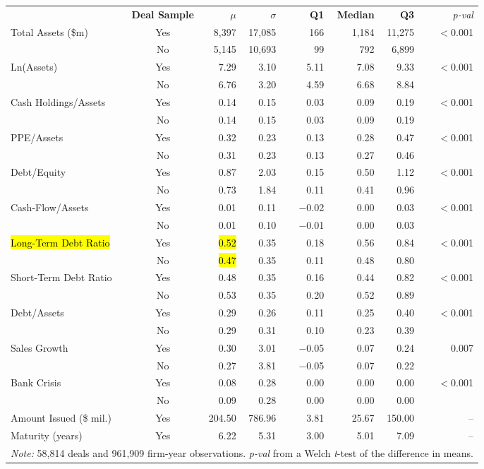 \documentclass[border=6pt]{standalone}
\begin{document}
\begin{tabular}{lcrrcrrrcr}
\toprule
 & \textbf{Deal Sample} & $\mu$ & $\sigma$ & & \textbf{Q1} & \textbf{Median} & \textbf{Q3} & & \textit{p-val} \\
\cmidrule{2-2} \cmidrule{3-4} \cmidrule{6-8} \cmidrule{10-10}
Total Assets (\$m) & Yes & 8,397 & 17,085 & & 166 & 1,184 & 11,275 & & $<$0.001 \\
 & No & 5,145 & 10,693 & & 99 & 792 & 6,899 & & \\ \cmidrule{2-10}
Ln(Assets) & Yes & 7.29 & 3.10 & & 5.11 & 7.08 & 9.33 & & $<$0.001 \\
 & No & 6.76 & 3.20 & & 4.59 & 6.68 & 8.84 & & \\ \cmidrule{2-10}
Cash Holdings/Assets & Yes & 0.14 & 0.15 & & 0.03 & 0.09 & 0.19 & & $<$0.001 \\
 & No & 0.14 & 0.15 & & 0.03 & 0.09 & 0.19 & & \\ \cmidrule{2-10}
PPE/Assets & Yes & 0.32 & 0.23 & & 0.13 & 0.28 & 0.47 & & $<$0.001 \\
 & No & 0.31 & 0.23 & & 0.13 & 0.27 & 0.46 & & \\ \cmidrule{2-10}
Debt/Equity & Yes & 0.87 & 2.03 & & 0.15 & 0.50 & 1.12 & & $<$0.001 \\
 & No & 0.73 & 1.84 & & 0.11 & 0.41 & 0.96 & & \\ \cmidrule{2-10}
Cash-Flow/Assets & Yes & 0.01 & 0.11 & & $-$0.02 & 0.00 & 0.03 & & $<$0.001 \\
 & No & 0.01 & 0.10 & & $-$0.01 & 0.00 & 0.03 & & \\ \cmidrule{2-10}
\hl{Long-Term Debt Ratio} & Yes & \hl{0.52} & 0.35 & & 0.18 & 0.56 & 0.84 & & $<$0.001 \\
 & No & \hl{0.47} & 0.35 & & 0.11 & 0.48 & 0.80 & & \\ \cmidrule{2-10}
Short-Term Debt Ratio & Yes & 0.48 & 0.35 & & 0.16 & 0.44 & 0.82 & & $<$0.001 \\
 & No & 0.53 & 0.35 & & 0.20 & 0.52 & 0.89 & & \\ \cmidrule{2-10}
Debt/Assets & Yes & 0.29 & 0.26 & & 0.11 & 0.25 & 0.40 & & $<$0.001 \\
 & No & 0.29 & 0.31 & & 0.10 & 0.23 & 0.39 & & \\ \cmidrule{2-10}
Sales Growth & Yes & 0.30 & 3.01 & & $-$0.05 & 0.07 & 0.24 & & 0.007 \\
 & No & 0.27 & 3.81 & & $-$0.05 & 0.07 & 0.22 & & \\ \cmidrule{2-10}
Bank Crisis & Yes & 0.08 & 0.28 & & 0.00 & 0.00 & 0.00 & & $<$0.001 \\
 & No & 0.09 & 0.28 & & 0.00 & 0.00 & 0.00 & & \\ \cmidrule{2-10}
Amount Issued (\$ mil.) & Yes & 204.50 & 786.96 & & 3.81 & 25.67 & 150.00 & & -- \\ \cmidrule{2-10}
Maturity (years) & Yes & 6.22 & 5.31 & & 3.00 & 5.01 & 7.09 & & -- \\
\bottomrule
\multicolumn{10}{l}{\footnotesize\textit{Note:} 58,814 deals and 961,909 firm-year observations. \textit{p-val} from a Welch \textit{t}-test of the difference in means.}
\end{tabular}
\end{document}
